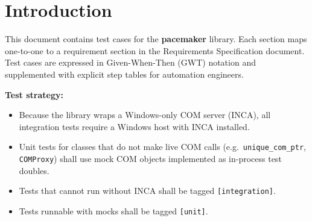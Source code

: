 \section{Introduction}

This document contains test cases for the \textbf{pacemaker} library. Each section maps
one-to-one to a requirement section in the Requirements Specification document. Test
cases are expressed in Given-When-Then (GWT) notation and supplemented with explicit
step tables for automation engineers.

\medskip
\noindent\textbf{Test strategy:}
\begin{itemize}
  \item Because the library wraps a Windows-only COM server (INCA), all integration tests
        require a Windows host with INCA installed.
  \item Unit tests for classes that do not make live COM calls (e.g.\ \texttt{unique\_com\_ptr},
        \texttt{COMProxy}) shall use mock COM objects implemented as in-process test doubles.
  \item Tests that cannot run without INCA shall be tagged \texttt{[integration]}.
  \item Tests runnable with mocks shall be tagged \texttt{[unit]}.
\end{itemize}